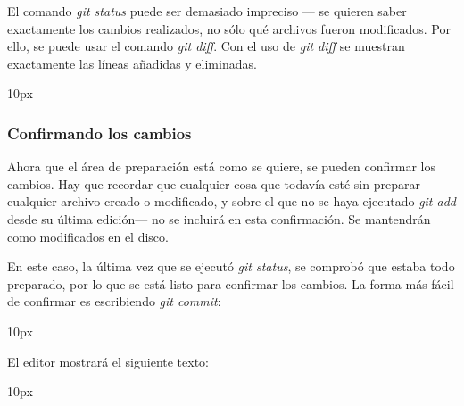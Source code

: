 El comando {\it git status} puede ser demasiado impreciso --- se quieren saber exactamente los cambios realizados, no sólo qué archivos fueron modificados. Por ello, se puede usar el comando {\it git diff}. Con el uso de {\it git diff} se muestran exactamente las líneas añadidas y eliminadas.

\begin{center}{
	\fboxsep 10px
	}
\end{center}

\subsubsection{Confirmando los cambios}

Ahora que el área de preparación está como se quiere, se pueden confirmar los cambios. Hay que recordar que cualquier cosa que todavía esté sin preparar ---cualquier archivo creado o modificado, y sobre el que no se haya ejecutado {\it git add} desde su última edición--- no se incluirá en esta confirmación. Se mantendrán como modificados en el disco.

En este caso, la última vez que se ejecutó {\it git status}, se comprobó que estaba todo preparado, por lo que se está listo para confirmar los cambios. La forma más fácil de confirmar es escribiendo {\it git commit}:

\begin{center}{
	\fboxsep 10px
	}
\end{center}

El editor mostrará el siguiente texto:

\begin{center}{
	\fboxsep 10px
	}
\end{center}

